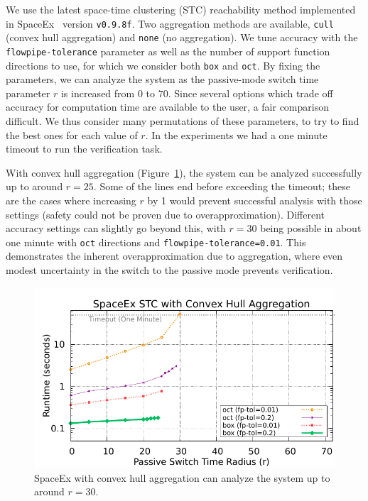 We use the latest space-time clustering (STC) reachability method implemented in SpaceEx~\cite{frehse2013flowpipe} version \texttt{v0.9.8f}.
%
Two aggregation methods are available, \texttt{cull} (convex hull aggregation) and \texttt{none} (no aggregation).
%
We tune accuracy with the \texttt{flowpipe-tolerance} parameter as well as the number of support function directions to use, for which we consider
both \texttt{box} and \texttt{oct}.
%
By fixing the parameters, we can analyze the system as the passive-mode switch time parameter $r$ is increased from $0$ to $70$.
%
Since several options which trade off accuracy for computation time are available to the user, a fair comparison difficult.
%
We thus consider many permutations of these parameters, to try to find the best ones for each value of $r$.
%
In the experiments we had a one minute timeout to run the verification task.

With convex hull aggregation (Figure~\ref{fig:spaceex_chull}), the system can be analyzed successfully up to around $r=25$.
%
Some of the lines end before exceeding the timeout; these are the cases where increasing $r$ by 1 would prevent
successful analysis with those settings (safety could not be proven due to overapproximation).
%
Different accuracy settings can slightly go beyond this, with $r=30$ being possible in about one minute with \texttt{oct} directions and
\texttt{flowpipe-tolerance=0.01}.
%
This demonstrates the inherent overapproximation due to aggregation, where even modest uncertainty in the switch to the passive mode
prevents verification.

\begin{figure}[t]
\centerline{\includegraphics[width=0.9\columnwidth]{images/chull.pdf}}
\caption{SpaceEx with convex hull aggregation can analyze the system up to around $r=30$.}
\label{fig:spaceex_chull}
\end{figure}

